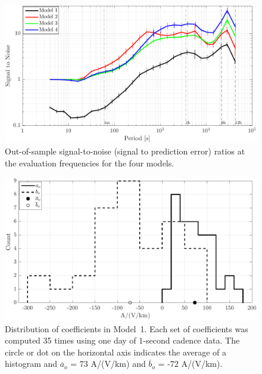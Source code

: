 \documentclass[draft,linenumbers]{agujournal2018}
\begin{document}
\begin{figure}[h]
  \centering
  \includegraphics[width=\textwidth]{figures/plot_model_summary_SN-options-1-v0-o0.pdf}
  \caption{Out-of-sample signal-to-noise (signal to prediction error) ratios at the evaluation frequencies for the four models.}
  \label{SN}
\end{figure}

\begin{figure}[h]
  \centering
  \includegraphics[width=\textwidth]{figures/plot_model_summary_aobo_histograms-options-1-v0-o0.pdf}
  \caption{Distribution of coefficients in Model~1. Each set of coefficients was computed 35 times using one day of 1-second cadence data. The circle or dot on the horizontal axis indicates the average of a histogram and $\overline{a}_o$ = 73 A/(V/km) and $\overline{b}_o$ = -72 A/(V/km).}
  \label{histogram}
\end{figure}
\end{document}

